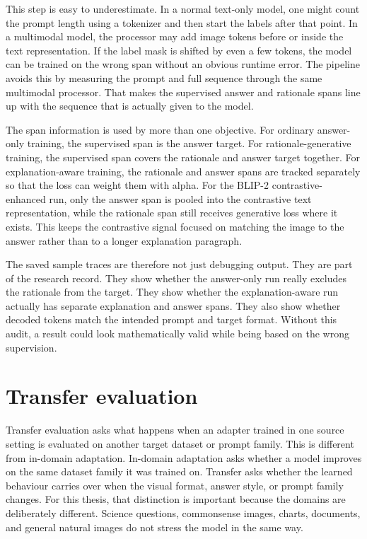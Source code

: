 \documentclass[12pt,bibliography=totoc,listof=totoc,BCOR=5mm,DIV=12,oneside,open=any]{scrbook}
\begin{document}
This step is easy to underestimate.
In a normal text-only model, one might count the prompt length using a tokenizer and then start the labels after that point.
In a multimodal model, the processor may add image tokens before or inside the text representation.
If the label mask is shifted by even a few tokens, the model can be trained on the wrong span without an obvious runtime error.
The pipeline avoids this by measuring the prompt and full sequence through the same multimodal processor.
That makes the supervised answer and rationale spans line up with the sequence that is actually given to the model.

The span information is used by more than one objective.
For ordinary answer-only training, the supervised span is the answer target.
For rationale-generative training, the supervised span covers the rationale and answer target together.
For explanation-aware training, the rationale and answer spans are tracked separately so that the loss can weight them with alpha.
For the BLIP-2 contrastive-enhanced run, only the answer span is pooled into the contrastive text representation, while the rationale span still receives generative loss where it exists.
This keeps the contrastive signal focused on matching the image to the answer rather than to a longer explanation paragraph.

The saved sample traces are therefore not just debugging output.
They are part of the research record.
They show whether the answer-only run really excludes the rationale from the target.
They show whether the explanation-aware run actually has separate explanation and answer spans.
They also show whether decoded tokens match the intended prompt and target format.
Without this audit, a result could look mathematically valid while being based on the wrong supervision.

\section{Transfer evaluation}
Transfer evaluation asks what happens when an adapter trained in one source setting is evaluated on another target dataset or prompt family.
This is different from in-domain adaptation.
In-domain adaptation asks whether a model improves on the same dataset family it was trained on.
Transfer asks whether the learned behaviour carries over when the visual format, answer style, or prompt family changes.
For this thesis, that distinction is important because the domains are deliberately different.
Science questions, commonsense images, charts, documents, and general natural images do not stress the model in the same way.
\end{document}
